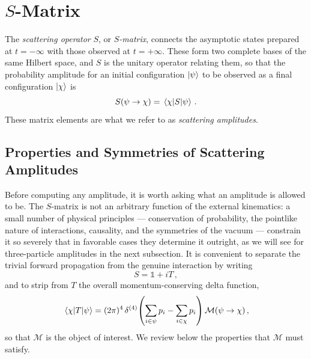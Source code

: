 \section{\texorpdfstring{$S$-Matrix}{S-Matrix}\label{sec:Smatrix}}


The \textit{scattering operator} $S$, or \textit{$S$-matrix}, connects the asymptotic states
prepared at $t=-\infty$ with those observed at $t=+\infty$. These form two complete bases of the
same Hilbert space, and $S$ is the unitary operator relating them, so that the probability amplitude
for an initial configuration $\ket{\psi}$ to be observed as a final configuration $\ket{\chi}$ is
\begin{equation}
    S(\psi \to \chi) = \mel{\chi}{S}{\psi}\,.
\end{equation}
These matrix elements are what we refer to as \textit{scattering amplitudes}.

\subsection{Properties and Symmetries of Scattering Amplitudes}

Before computing any amplitude, it is worth asking what an amplitude is allowed to be. The
$S$-matrix is not an arbitrary function of the external kinematics: a small number of physical
principles --- conservation of probability, the pointlike nature of interactions, causality, and
the symmetries of the vacuum --- constrain it so severely that in favorable cases they determine it
outright, as we will see for three-particle amplitudes in the next subsection. 
It is convenient to
separate the trivial forward propagation from the genuine interaction by writing
\begin{equation}\label{eq:Tdef}
    S = \mathbb 1 + iT\,,
\end{equation}
and to strip from $T$ the overall momentum-conserving delta function,
\begin{equation}\label{eq:Mdef}
    \mel{\chi}{T}{\psi} = (2\pi)^4\,\delta^{(4)}\!\left(\sum_{i\in\psi} p_i - \sum_{i\in\chi} p_i \right)\mathcal M(\psi\to\chi)\,,
\end{equation}
so that $\mathcal M$ is the object of interest. We review below the properties that $\mathcal M$
must satisfy.

